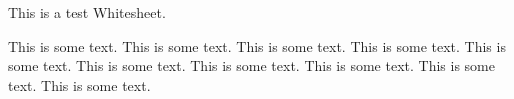 \documentclass[white]{airship}
\begin{document}
\name{\wTest{}} %

This is a test Whitesheet.

This is some text.  This is some text.  This is some text.  This is
some text.  This is some text.  This is some text.  This is some text.
This is some text.  This is some text.  This is some text.
\end{document}
